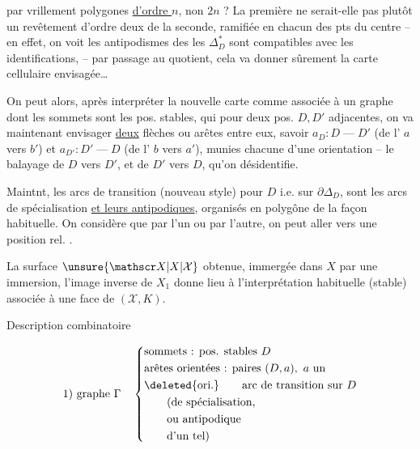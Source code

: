 par vrillement \uline{} polygones \uline{d'ordre $n$}, non $2n$ ?  La première ne serait-elle pas plutôt un revêtement d'ordre deux de la seconde, ramifiée en chacun des pts du centre -- en effet, on voit   les antipodismes des les $\Delta_D^*$ sont compatibles avec les identifications, -- par passage au quotient, cela va donner sûrement la carte cellulaire envisagée\ldots{}

On peut alors,  après  interpréter la nouvelle carte comme associée à un graphe  dont les sommets sont les pos. stables, qui pour deux pos. $D,D'$ adjacentes, on va maintenant envisager \uline{deux} flèches ou arêtes entre eux, savoir $a_D:D\mathbin{\text{---}}D'$ (de l' $a$ vers $b'$) et $a_{D'}:D'\mathbin{\text{---}}D$ (de l' $b$ vers $a'$), munies chacune d'une orientation -- le balayage de $D$ vers $D'$, et de $D'$ vers $D$, qu'on désidentifie.

Maintnt, les arcs de transition (nouveau style) pour $D$ i.e. sur $\partial\Delta_D$, sont les arcs de spécialisation \uline{et leurs antipodiques}, organisés en polygône de la façon habituelle. On considère que par l'un ou par l'autre, on peut aller vers une position rel. .

La surface $\unsure{\mathscr X|X|\mathcal X}$ obtenue, immergée dans $X$ par une immersion,  l'image inverse  de $X_1$  donne lieu à  l'interprétation habituelle    (stable) associée à une face de $(\mathscr X,K)$.

Description combinatoire

\[
\begin{aligned}
\text{1) graphe }\Gamma\quad\left\{\begin{aligned}
&\text{sommets : pos. stables }D\\
&\text{arêtes orientées : paires }(D,a),\ a\text{ un}\\
&\deleted{\text{ori.}}\qquad\text{arc de transition sur }D\\
&\qquad\text{(de spécialisation,}\\
&\qquad\text{ou antipodique}\\
&\qquad\text{d'un tel)}
\end{aligned}\right.
\end{aligned}
\]

